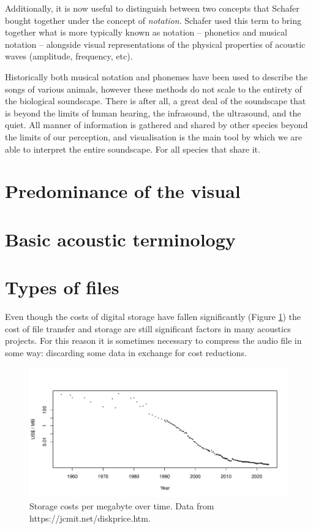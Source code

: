 \documentclass[
]{book}
\begin{document}
Additionally, it is now useful to distinguish between two concepts that Schafer bought together under the concept of \emph{notation}. Schafer used this term to bring together what is more typically known as notation -- phonetics and musical notation -- alongside visual representations of the physical properties of acoustic waves (amplitude, frequency, etc).

Historically both musical notation and phonemes have been used to describe the songs of various animals, however these methods do not scale to the entirety of the biological soundscape. There is after all, a great deal of the soundscape that is beyond the limits of human hearing, the infrasound, the ultrasound, and the quiet. All manner of information is gathered and shared by other species beyond the limits of our perception, and visualisation is the main tool by which we are able to interpret the entire soundscape. For all species that share it.

\hypertarget{predominance-of-the-visual}{%
\section{Predominance of the visual}\label{predominance-of-the-visual}}

\hypertarget{basic-acoustic-terminology}{%
\section{Basic acoustic terminology}\label{basic-acoustic-terminology}}

\hypertarget{types-of-files}{%
\section{Types of files}\label{types-of-files}}

Even though the costs of digital storage have fallen significantly (Figure \ref{fig:storage-costs}) the cost of file transfer and storage are still significant factors in many acoustics projects. For this reason it is sometimes necessary to compress the audio file in some way: discarding some data in exchange for cost reductions.

\begin{figure}

{\centering \includegraphics[width=0.9\linewidth]{_main_files/figure-latex/storage-costs-1} 

}

\caption{Storage costs per megabyte over time. Data from https://jcmit.net/diskprice.htm.}\label{fig:storage-costs}
\end{figure}
\end{document}
